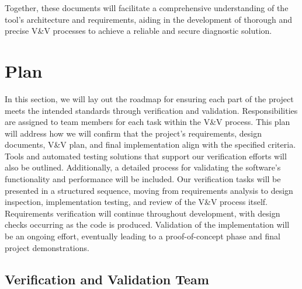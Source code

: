 \documentclass[12pt, titlepage]{article}
\begin{document}
Together, these documents will facilitate a comprehensive understanding of the tool’s architecture and requirements, aiding in the development of thorough and precise V\&V processes to achieve a reliable and secure diagnostic solution.

\section{Plan}

In this section, we will lay out the roadmap for ensuring each part of the project meets the intended standards through verification and validation. Responsibilities are assigned to team members for each task within the V\&V process. This plan will address how we will confirm that the project’s requirements, design documents, V\&V plan, and final implementation align with the specified criteria. Tools and automated testing solutions that support our verification efforts will also be outlined. Additionally, a detailed process for validating the software’s functionality and performance will be included. Our verification tasks will be presented in a structured sequence, moving from requirements analysis to design inspection, implementation testing, and review of the V\&V process itself. Requirements verification will continue throughout development, with design checks occurring as the code is produced. Validation of the implementation will be an ongoing effort, eventually leading to a proof-of-concept phase and final project demonstrations.

\subsection{Verification and Validation Team}
\end{document}
